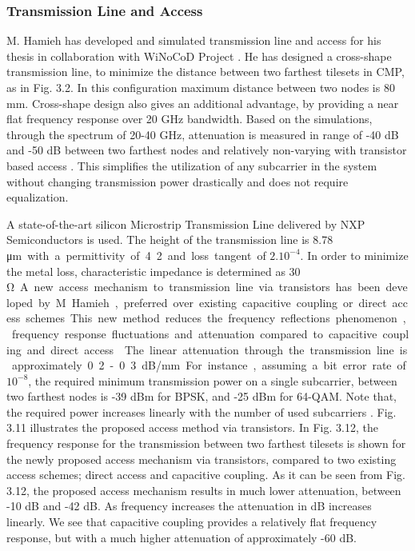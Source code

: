 \subsubsection{Transmission Line and Access}

M. Hamieh has developed and simulated transmission line and access for his thesis in collaboration with WiNoCoD Project \cite{hamieh2014sizing}. He has designed a cross-shape transmission line, to minimize the distance between two farthest tilesets in CMP, as in Fig. 3.2. In this configuration maximum distance between two nodes is 80 mm. Cross-shape design also gives an additional advantage, by providing a near flat frequency response over 20 GHz bandwidth. Based on the simulations, through the spectrum of 20-40 GHz, attenuation is measured in range of -40 dB and -50 dB between two farthest nodes and relatively non-varying with transistor based access \cite{hamieh2014sizing}. This simplifies the utilization of any subcarrier in the system without changing transmission power drastically and does not require equalization. 

A state-of-the-art silicon Microstrip Transmission Line delivered by NXP Semiconductors is used. The height of the transmission line is 8.78 \si\micro m with a permittivity of 4.2 and loss tangent of $2.10^{-4}$. In order to minimize the metal loss, characteristic impedance is determined as 30 \si\ohm. A new access mechanism to transmission line via transistors has been developed by M. Hamieh, preferred over existing capacitive coupling or direct access schemes. This new method reduces the frequency reflections phenomenon, frequency response fluctuations and attenuation compared to capacitive coupling and direct access \cite{hamieh2014sizing}. 

The linear attenuation through the transmission line is approximately 0.2-0.3 dB/mm. For instance, assuming a bit error rate of $10^{-8}$, the required minimum transmission power on a single subcarrier, between two farthest nodes is -39 dBm for BPSK, and -25 dBm for 64-QAM. Note that, the required power increases linearly with the number of used subcarriers \cite{hamieh2014sizing}.  Fig. 3.11 illustrates the proposed access method via transistors. In Fig. 3.12, the frequency response for the transmission between two farthest tilesets is shown for the newly proposed access mechanism via transistors, compared to two existing access schemes; direct access and capacitive coupling. As it can be seen from Fig. 3.12, the proposed access mechanism results in much lower attenuation, between -10 dB and -42 dB. As frequency increases the attenuation in dB increases linearly. We see that capacitive coupling provides a relatively flat frequency response, but with a much higher attenuation of approximately -60 dB.


